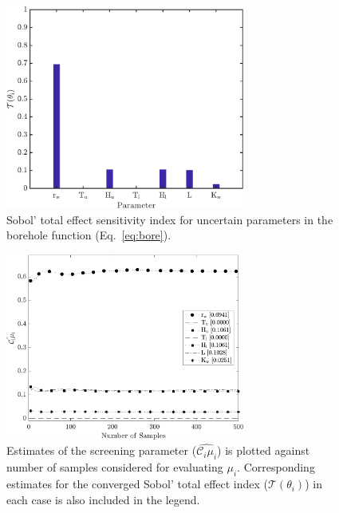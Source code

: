 \begin{figure}[p]
 \begin{center}
  \includegraphics[width=0.70\textwidth]{./Figures/sense_borehole}
\caption{Sobol' total effect sensitivity index for uncertain parameters in the borehole
function (Eq.~\ref{eq:bore}).}
\label{fig:sense_bore}
\end{center}
\end{figure}

\clearpage

\begin{figure}[p]
 \begin{center}
  \includegraphics[width=0.70\textwidth]{./Figures/ub_conv_borehole}
\caption{Estimates of the screening parameter ($\hat{\mathcal{C}_i\mu_i}$) is plotted 
against number of samples considered for evaluating $\mu_i$. Corresponding estimates
for the converged Sobol' total effect index ($\mathcal{T}(\theta_i)$) in each case is also included in the
legend.}
\label{fig:screen_bore}
\end{center}
\end{figure}

